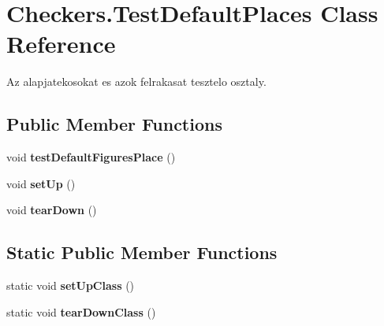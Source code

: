 \hypertarget{class_checkers_1_1_test_default_places}{}\section{Checkers.\+Test\+Default\+Places Class Reference}
\label{class_checkers_1_1_test_default_places}


Az alapjatekosokat es azok felrakasat tesztelo osztaly.  


\subsection*{Public Member Functions}
\begin{DoxyCompactItemize}
\item 
\hypertarget{class_checkers_1_1_test_default_places_ae6eecff89e3b78e7c9935909043fc3ce}{}void {\bfseries test\+Default\+Figures\+Place} ()\label{class_checkers_1_1_test_default_places_ae6eecff89e3b78e7c9935909043fc3ce}

\item 
\hypertarget{class_checkers_1_1_test_default_places_aa9256b3a6b00f5d4fd5c948c4f4b4418}{}void {\bfseries set\+Up} ()\label{class_checkers_1_1_test_default_places_aa9256b3a6b00f5d4fd5c948c4f4b4418}

\item 
\hypertarget{class_checkers_1_1_test_default_places_a644b360d749015b96cd44be4af22394b}{}void {\bfseries tear\+Down} ()\label{class_checkers_1_1_test_default_places_a644b360d749015b96cd44be4af22394b}

\end{DoxyCompactItemize}
\subsection*{Static Public Member Functions}
\begin{DoxyCompactItemize}
\item 
\hypertarget{class_checkers_1_1_test_default_places_af20e2f39313d1c85dcfb74210dd29354}{}static void {\bfseries set\+Up\+Class} ()\label{class_checkers_1_1_test_default_places_af20e2f39313d1c85dcfb74210dd29354}

\item 
\hypertarget{class_checkers_1_1_test_default_places_a6f752a164a2e42e8568b39e9263cfd55}{}static void {\bfseries tear\+Down\+Class} ()\label{class_checkers_1_1_test_default_places_a6f752a164a2e42e8568b39e9263cfd55}

\end{DoxyCompactItemize}


